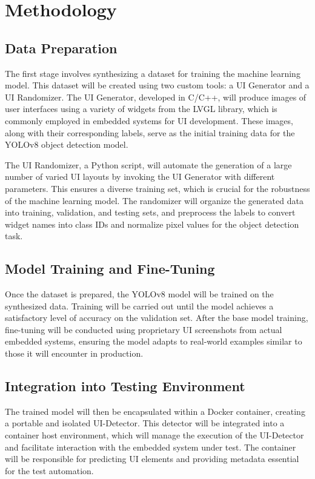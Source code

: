 \documentclass[Proposal,BIC,english,IEEE]{BASE/twbook} %
\begin{document}
\chapter{Methodology}
\section{Data Preparation}
The first stage involves synthesizing a dataset for training the machine learning model. This dataset will be created using two custom tools: a UI Generator and a UI Randomizer. The UI Generator, developed in C/C++, will produce images of user interfaces using a variety of widgets from the LVGL library, which is commonly employed in embedded systems for UI development. These images, along with their corresponding labels, serve as the initial training data for the YOLOv8 object detection model.

The UI Randomizer, a Python script, will automate the generation of a large number of varied UI layouts by invoking the UI Generator with different parameters. This ensures a diverse training set, which is crucial for the robustness of the machine learning model. The randomizer will organize the generated data into training, validation, and testing sets, and preprocess the labels to convert widget names into class IDs and normalize pixel values for the object detection task.

\section{Model Training and Fine-Tuning}
Once the dataset is prepared, the YOLOv8 model will be trained on the synthesized data. Training will be carried out until the model achieves a satisfactory level of accuracy on the validation set. After the base model training, fine-tuning will be conducted using proprietary UI screenshots from actual embedded systems, ensuring the model adapts to real-world examples similar to those it will encounter in production.

\section{Integration into Testing Environment}
The trained model will then be encapsulated within a Docker container, creating a portable and isolated UI-Detector. This detector will be integrated into a container host environment, which will manage the execution of the UI-Detector and facilitate interaction with the embedded system under test. The container will be responsible for predicting UI elements and providing metadata essential for the test automation.
\end{document}
